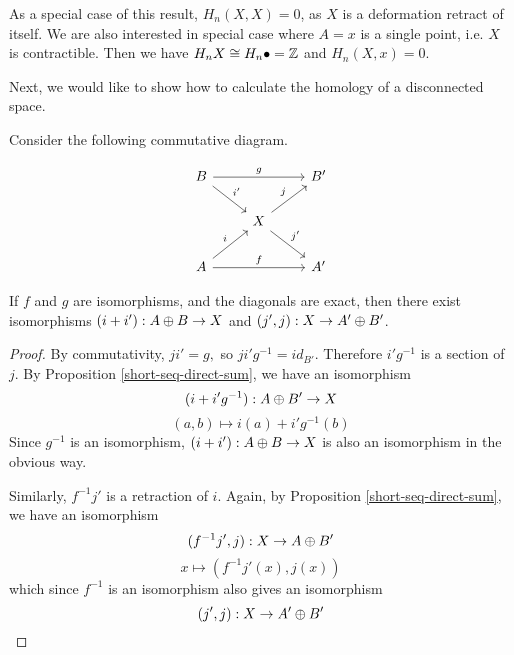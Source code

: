 \begin{remark}
\label{contractible-0}
As a special case of this result, $H_n(X,X)=0$, as $X$ is a deformation retract of itself. We are also interested in special case where $A=x$ is a single point, i.e. $X$ is contractible. Then we have $H_nX\cong H_n\bullet=\mathbb{Z}$ and $H_n(X,x)=0$.
\end{remark}

Next, we would like to show how to calculate the homology of a disconnected space.

\begin{lemma}\label{dsum-lemma}
Consider the following commutative diagram.

\[\begin{tikzcd}
B \arrow[rr, "g"] \arrow[rd, "i'"] &                                    & B' \\
                                   & X \arrow[ru, "j"] \arrow[rd, "j'"] &    \\
A \arrow[ru, "i"] \arrow[rr, "f"]  &                                    & A'
\end{tikzcd}\]

If $f$ and $g$ are isomorphisms, and the diagonals are exact, then there exist isomorphisms $(i+i'):A\oplus B\rightarrow X$ and $(j',j):X\rightarrow A'\oplus B'$.
\end{lemma}
\begin{proof}
By commutativity, $ji'=g,$ so $ji'g^{-1}=id_{B'}$. Therefore $i'g^{-1}$ is a section of $j$. By Proposition \ref{short-seq-direct-sum}, we have an isomorphism $$(i+i'g^{-1}):A\oplus B'\rightarrow X$$
$$(a,b)\mapsto i(a)+i'g^{-1}(b)$$
Since $g^{-1}$ is an isomorphism, $(i+i'):A\oplus B\rightarrow X$ is also an isomorphism in the obvious way.

Similarly, $f^{-1}j'$ is a retraction of $i$. Again, by Proposition \ref{short-seq-direct-sum}, we have an isomorphism $$(f^{-1}j',j):X\rightarrow A\oplus B'$$
$$x\mapsto (f^{-1}j'(x),j(x))$$
which since $f^{-1}$ is an isomorphism also gives an isomorphism 
$$(j',j):X\rightarrow A'\oplus B'$$
\end{proof}


